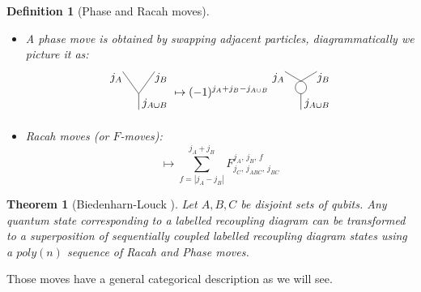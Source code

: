 \documentclass{article}
\newtheorem{definition}{Definition}
\newtheorem{theorem}{Theorem}
\begin{document}
\begin{definition}[Phase and Racah moves]
	\begin{itemize}
		\item A phase move is obtained by swapping adjacent particles, diagrammatically we picture it as:
		\begin{equation}
			\begin{gathered}
			\begin{tikzpicture}
			\node (0) at (0.5, -0.3) {$j_{A\cup B}$};
			\node (0) at (-0.7, 0.5) {$j_A$};
			\node (0) at (0.7, 0.5) {$j_B$};
			\draw (-0.5, 0.7)--(0,0)--(0,-0.5);
			\draw (0.5, 0.7)--(0,0);
			\end{tikzpicture}
			\end{gathered}
			\mapsto
			(-1)^{j_A+j_B-j_{A \cup B}}
			\begin{gathered}
			\begin{tikzpicture}
			\node (0) at (0.5, -0.3) {$j_{A\cup B}$};
			\node (0) at (-0.7, 0.5) {$j_A$};
			\node (0) at (0.7, 0.5) {$j_B$};
			\draw [bend right=80, looseness=1.5] (0,0) to (0,0.4);
			\draw [bend left=80, looseness=1.5] (0,0) to (0,0.4);
			\draw (0,0)--(0,-0.5);
			\draw (0.5, 0.7)--(0,0.4)--(-0.5, 0.7);
			\end{tikzpicture}
			\end{gathered}
		\end{equation}
		\item Racah moves (or $F$-moves):
		\begin{equation}
			\mapsto \sum_{f = |j_A - j_B|}^{j_A+j_B}  F^{j_A,\, j_B, \, f}_{j_C, \, j_{ABC}, \, j_{BC}} 
		\end{equation}
	\end{itemize}
\end{definition}
\begin{theorem}[Biedenharn-Louck \cite{Aquilanti09}] 
	Let $A,B,C$ be disjoint sets of qubits.
	Any quantum state corresponding to a labelled recoupling diagram can be transformed to a superposition of sequentially coupled labelled recoupling diagram states using a $poly(n)$ sequence of Racah and Phase moves.
\end{theorem}
Those moves have a general categorical description as we will see.
\end{document}
